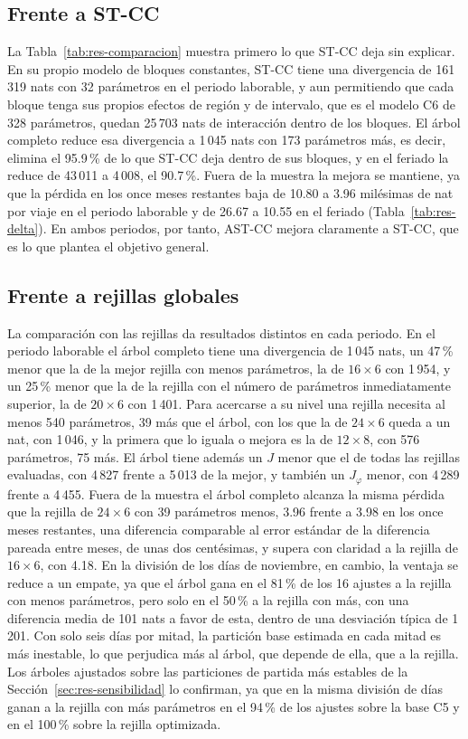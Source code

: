 \subsection{Frente a ST-CC}

La Tabla~\ref{tab:res-comparacion} muestra primero lo que ST-CC deja sin explicar.
En su propio modelo de bloques constantes, ST-CC tiene una divergencia de
161\,319 nats con 32 parámetros en el periodo laborable, y aun permitiendo que cada
bloque tenga sus propios efectos de región y de intervalo, que es el modelo C6 de
328 parámetros, quedan 25\,703 nats de interacción dentro de los bloques. El árbol
completo reduce esa divergencia a 1\,045 nats con 173 parámetros más, es decir,
elimina el 95.9\,\% de lo que ST-CC deja dentro de sus bloques, y en el feriado la
reduce de 43\,011 a 4\,008, el 90.7\,\%. Fuera de la muestra la mejora se
mantiene, ya que la pérdida en los once meses restantes baja de 10.80 a 3.96
milésimas de nat por viaje en el periodo laborable y de 26.67 a 10.55 en el
feriado (Tabla~\ref{tab:res-delta}). En ambos periodos, por tanto, AST-CC mejora
claramente a ST-CC, que es lo que plantea el objetivo general.

\subsection{Frente a rejillas globales}

La comparación con las rejillas da resultados distintos en cada periodo. En el
periodo laborable el árbol completo tiene una divergencia de 1\,045 nats, un
47\,\% menor que la de la mejor rejilla con menos parámetros, la de
$16 \times 6$ con 1\,954, y un 25\,\% menor que la de la rejilla con el número
de parámetros inmediatamente superior, la de $20 \times 6$ con 1\,401. Para
acercarse a su nivel una rejilla necesita al menos 540 parámetros, 39 más que el
árbol, con los que la de $24 \times 6$ queda a un nat, con 1\,046, y la primera
que lo iguala o mejora es la de $12 \times 8$, con 576 parámetros, 75 más. El árbol
tiene además un $J$ menor que el de todas las rejillas evaluadas, con 4\,827
frente a 5\,013 de la mejor, y también un $J_\varphi$ menor, con 4\,289 frente a
4\,455. Fuera de la muestra el árbol completo alcanza la misma pérdida que la
rejilla de $24 \times 6$ con 39 parámetros menos, 3.96 frente a 3.98 en los once
meses restantes, una diferencia comparable al error estándar de la diferencia
pareada entre meses, de unas dos centésimas, y supera con claridad a la rejilla de
$16 \times 6$, con 4.18. En la división de los días de noviembre, en cambio,
la ventaja se reduce a un empate, ya que el árbol gana en el 81\,\% de los 16
ajustes a la rejilla con menos parámetros, pero solo en el 50\,\% a la rejilla con
más, con una diferencia media de 101 nats a favor de esta, dentro de una
desviación típica de 1\,201. Con solo seis días por mitad, la partición base
estimada en cada mitad es más inestable, lo que perjudica más al árbol, que
depende de ella, que a la rejilla. Los árboles ajustados sobre las particiones de
partida más estables de la Sección~\ref{sec:res-sensibilidad} lo confirman, ya
que en la misma división de días ganan a la rejilla con más parámetros en el
94\,\% de los ajustes sobre la base C5 y en el 100\,\% sobre la rejilla optimizada.

